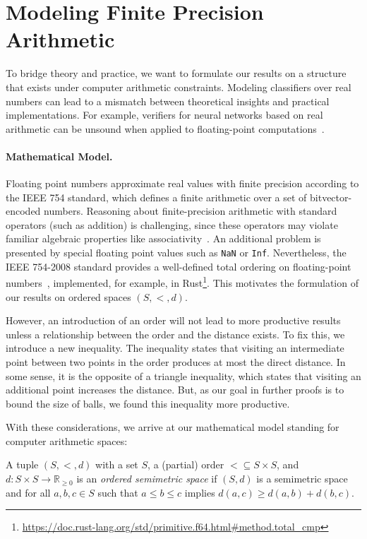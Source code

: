 \section{Modeling Finite Precision Arithmetic}
\label{sec:modeling-arithmetic}

To bridge theory and practice, we want to formulate our results on a structure that exists under computer arithmetic constraints. Modeling classifiers over real numbers can lead to a mismatch between theoretical insights and practical implementations. For example, verifiers for neural networks based on real arithmetic can be unsound when applied to floating-point computations~\cite{jia2021exploiting,cordeiro2025neural}.

\paragraph{Mathematical Model.} Floating point numbers approximate real values with finite precision according to the IEEE 754 standard, which defines a finite arithmetic over a set of bitvector-encoded numbers.
Reasoning about finite-precision arithmetic with standard operators (such as addition) is challenging, since these operators may violate familiar algebraic properties like associativity~\cite{Kneusel2025}. 
An additional problem is presented by special floating point values such as \texttt{NaN} or \texttt{Inf}.
Nevertheless, the IEEE 754-2008 standard provides a well-defined total ordering on floating-point numbers~\cite{4610935}, implemented, for example, in Rust\footnote{\url{https://doc.rust-lang.org/std/primitive.f64.html\#method.total\_cmp}}. This motivates the formulation of our results on ordered spaces $(S, <, d)$.

However, an introduction of an order will not lead to more productive results unless a relationship between the order and the distance exists. To fix this, we introduce a new inequality. The inequality states that visiting an intermediate point between two points in the order produces at most the direct distance. In some sense, it is the opposite of a triangle inequality, which states that visiting an additional point increases the distance. But, as our goal in further proofs is to bound the size of balls, we found this inequality more productive.

With these considerations, we arrive at our mathematical model standing for computer arithmetic spaces:
\begin{definition}
    \label{def:ordered-space}
    A tuple $(S, <, d)$ with a set $S$, a (partial) order $< \subseteq S \times S$, and $d: S \times S \rightarrow \mathbb{R}_{\geq 0}$ is an \emph{ordered semimetric space} if $(S, d)$ is a semimetric space and for all $a,b,c \in S$ such that $a \leq b \leq c$ implies $d(a, c) \geq d(a, b) + d(b,c)$.
\end{definition}

